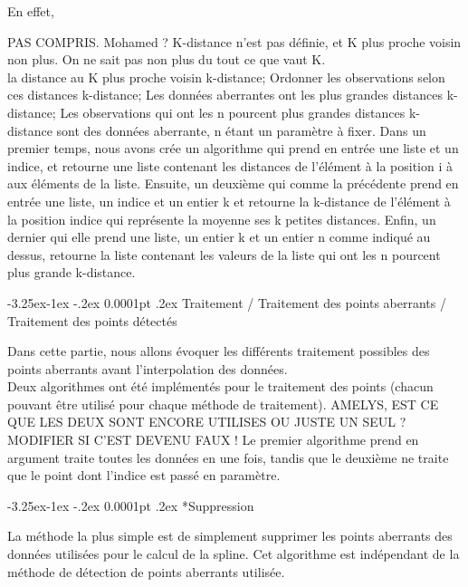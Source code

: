\documentclass[a4paper,12pt]{article} %
\makeatletter
\renewcommand\paragraph{\@startsection{paragraph}{4}{\z@}%
                                      {-3.25ex\@plus -1ex \@minus -.2ex}%
                                      {0.0001pt \@plus .2ex}%
                                      {\normalfont\normalsize\bfseries}}
\renewcommand\subparagraph{\@startsection{subparagraph}{5}{\z@}%
                                      {-3.25ex\@plus -1ex \@minus -.2ex}%
                                      {0.0001pt \@plus .2ex}%
                                      {\normalfont\normalsize\bfseries}}
\makeatother
\begin{document}
    					En effet, 
    					
    					PAS COMPRIS. Mohamed ? K-distance n'est pas définie, et K plus proche voisin non plus. On ne sait pas non plus du tout ce que vaut K.\\
    					
    					la distance au K plus proche voisin k-distance; Ordonner les observations selon ces distances k-distance; Les données aberrantes ont les plus grandes distances k-distance; Les observations qui ont les n pourcent plus grandes distances k-distance sont des données aberrante, n étant un paramètre à ﬁxer. Dans un premier temps, nous avons crée un algorithme qui prend en entrée une liste et un indice, et retourne une liste contenant les distances de l’élément à la position i à aux éléments de la liste. Ensuite, un deuxième qui comme la précédente prend en entrée une liste, un indice et un entier k et retourne la k-distance de l’élément à la position indice qui représente la moyenne ses k petites distances. Enﬁn, un dernier qui elle prend une liste, un entier k et un entier n comme indiqué au dessus, retourne la liste contenant les valeurs de la liste qui ont les n pourcent plus grande k-distance.
    					

				\paragraph{Traitement / Traitement des points aberrants / Traitement des points détectés}
				
    				Dans cette partie, nous allons évoquer les différents traitement possibles des points aberrants avant l'interpolation des données.\\
                        
                    Deux algorithmes ont été implémentés pour le traitement des points (chacun pouvant être utilisé pour chaque méthode de traitement). AMELYS, EST CE QUE LES DEUX SONT ENCORE UTILISES OU JUSTE UN SEUL ? MODIFIER SI C'EST DEVENU FAUX !
                    Le premier algorithme prend en argument traite toutes les données en une fois, tandis que le deuxième ne traite que le point dont l'indice est passé en paramètre. 
                    
					\subparagraph*{Suppression}
                    					
                        La méthode la plus simple est de simplement supprimer les points aberrants des données utilisées pour le calcul de la spline. Cet algorithme est indépendant de la méthode de détection de points aberrants utilisée.
                        
\end{document}
